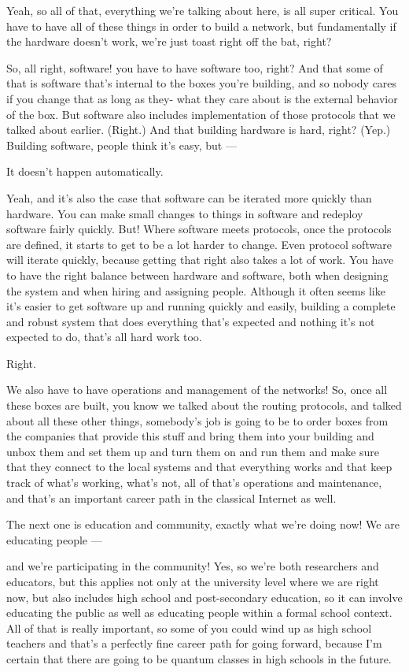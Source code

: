 \rrr Yeah, so all of that, everything we're talking about here, is all super critical. You have to have all of these things in order to build a network, but fundamentally if the hardware doesn't work, we're just toast right off the bat, right?

So, all right, software! you have to have software too, right? And that some of that is software that's internal to the boxes you're building, and so nobody cares if you change that as long as they- what they care about is the external behavior of the box. But software also includes implementation of those protocols that we talked about earlier. (Right.) And that building hardware is hard, right? (Yep.) Building software, people think it's easy, but ---

\mmm It doesn't happen automatically.

\rrr Yeah, and it's also the case that software can be iterated more quickly than hardware. You can make small changes to things in software and redeploy software fairly quickly. But! Where software meets protocols, once the protocols are defined, it starts to get to be a lot harder to change. Even protocol software will iterate quickly, because getting that right also takes a lot of work. You have to have the right balance between hardware and software, both when designing the system and when hiring and assigning people. Although it often seems like it's easier to get software up and running quickly and easily, building a complete and robust system that does everything that's expected and nothing it's not expected to do, that's all hard work too. 

\mmm Right.

\rrr We also have to have operations and management of the networks! So, once all these boxes are built, you know we talked about the routing protocols, and talked about all these other things, somebody's job is going to be to order boxes from the companies that provide this stuff and bring them into your building and unbox them and set them up and turn them on and run them and make sure that they connect to the local systems and that everything works and that keep track of what's working, what's not, all of that's operations and maintenance, and that's an important career path in the classical Internet as well.

\mmm The next one is education and community, exactly what we're doing now! We are educating people ---

\rrr and we're participating in the community! Yes, so we're both researchers and educators, but this applies not only at the university level where we are right now, but also includes high school and post-secondary education, so it can involve educating the public as well as educating people within a formal school context. All of that is really important, so some of you could wind up as high school teachers and that's a perfectly fine career path for going forward, because I'm certain that there are going to be quantum classes in high schools in the future.

